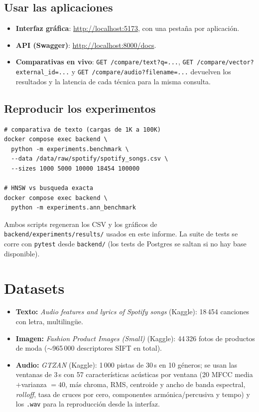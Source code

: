 \documentclass[conference]{IEEEtran}
\begin{document}
\subsection{Usar las aplicaciones}
\begin{itemize}
  \item \textbf{Interfaz gráfica}: \url{http://localhost:5173}, con una
        pestaña por aplicación.
  \item \textbf{API (Swagger)}: \url{http://localhost:8000/docs}.
  \item \textbf{Comparativas en vivo}: \texttt{GET /compare/text?q=...},
        \texttt{GET /compare/vector?external\_id=...} y
        \texttt{GET /compare/audio?filename=...} devuelven los resultados y
        la latencia de cada técnica para la misma consulta.
\end{itemize}

\subsection{Reproducir los experimentos}
\begin{lstlisting}
# comparativa de texto (cargas de 1K a 100K)
docker compose exec backend \
  python -m experiments.benchmark \
  --data /data/raw/spotify/spotify_songs.csv \
  --sizes 1000 5000 10000 18454 100000

# HNSW vs busqueda exacta
docker compose exec backend \
  python -m experiments.ann_benchmark
\end{lstlisting}
Ambos scripts regeneran los CSV y los gráficos de
\texttt{backend/experiments/results/} usados en este informe. La suite de
tests se corre con \texttt{pytest} desde \texttt{backend/} (los tests de
Postgres se saltan si no hay base disponible).

\section{Datasets}

\begin{itemize}
  \item \textbf{Texto:} \textit{Audio features and lyrics of Spotify songs}
        (Kaggle): 18\,454 canciones con letra, multilingüe.
  \item \textbf{Imagen:} \textit{Fashion Product Images (Small)} (Kaggle):
        44\,326 fotos de productos de moda ($\sim$965\,000 descriptores SIFT
        en total).
  \item \textbf{Audio:} \textit{GTZAN} (Kaggle): 1\,000 pistas de 30\,s en
        10 géneros; se usan las ventanas de 3\,s con 57 características
        acústicas por ventana (20 MFCC media$+$varianza $=40$, más chroma,
        RMS, centroide y ancho de banda espectral, \textit{rolloff}, tasa de
        cruces por cero, componentes armónica/percusiva y tempo) y los
        \texttt{.wav} para la reproducción desde la interfaz.
\end{itemize}
\end{document}
